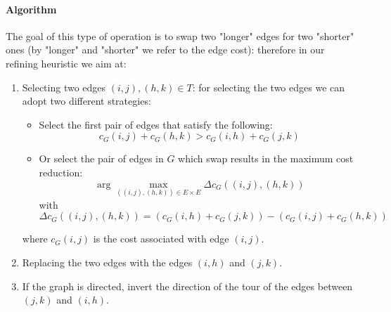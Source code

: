 \documentclass{article}
\begin{document}
\paragraph{Algorithm}
The goal of this type of operation is to swap two "longer" edges for two "shorter" ones (by "longer" and "shorter" we refer to the edge cost): 
therefore in our refining heuristic we aim at:
\begin{enumerate}
	\item Selecting two edges $(i, j), (h, k) \in T$: for selecting the two edges we can adopt two different strategies:
	\begin{itemize}
		\item Select the first pair of edges that satisfy the following:
		\begin{equation}
			c_{G}(i, j) + c_{G}(h, k) > c_{G}(i, h) + c_{G}(j, k)
			\label{eq:2-opt-move}
		\end{equation}
		\item Or select the pair of edges in $G$ which swap results in the maximum cost reduction:
		\begin{equation}
			\arg\max_{((i, j), (h, k)) \in E \times E} \Delta c_G ((i, j), (h, k))
			\label{eq:2-opt-move-argmax}
		\end{equation}
		with 
		\begin{equation}
			\Delta c_G((i, j), (h, k)) = (c_G(i, h) + c_G(j, k)) - (c_G(i, j) + c_G(h, k))
		\end{equation}
	\end{itemize}
	
	where $c_G(i, j)$ is the cost associated with edge $(i, j)$.
	\item Replacing the two edges with the edges $(i, h)$ and $(j, k)$.
	\item If the graph is directed, invert the direction of the tour of the edges between $(j, k)$ and $(i, h)$.
\end{enumerate}
\end{document}

